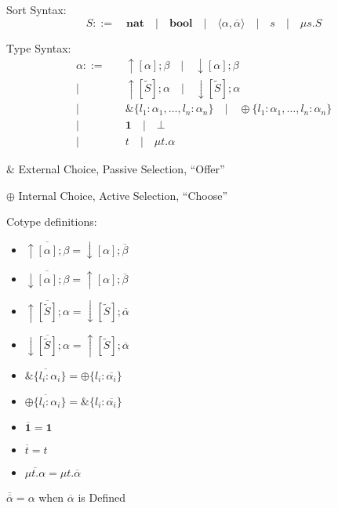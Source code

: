 Sort Syntax:
\cite{honda-vasconcelos-kubo98}
\[
  S ::= \quad \mathbf{nat} \quad
      | \quad \mathbf{bool} \quad
      | \quad \langle \alpha, \overline{\alpha} \rangle \quad
      | \quad s \quad
      | \quad \mu s.S
\]

Type Syntax:
\cite{honda-vasconcelos-kubo98}
\[
\begin{split}
  \alpha  ::=&\quad \uparrow[\alpha]; \beta \quad
            | \quad \downarrow[\alpha]; \beta \\
            |&\quad \uparrow[\tilde{S}]; \alpha \quad
            | \quad \downarrow[\tilde{S}]; \alpha \\
            |&\quad \& \{ l_1 : \alpha_1, \ldots, l_n : \alpha_n \} \quad
            | \quad \oplus \{ l_1 : \alpha_1, \ldots, l_n : \alpha_n \} \\
            |&\quad \mathbf{1} \quad
            | \quad \bot \quad \\
            |&\quad t \quad
            | \quad \mu t.\alpha
\end{split}
\]

$\&$ External Choice, Passive Selection, ``Offer''

$\oplus$ Internal Choice, Active Selection, ``Choose''


Cotype definitions:
\cite{honda-vasconcelos-kubo98}
\begin{itemize}
  \item $\overline{\uparrow[\alpha]; \beta}
    = \downarrow[\alpha]; \overline{\beta}$
  \item $\overline{\downarrow[\alpha]; \beta}
    = \uparrow[\alpha]; \overline{\beta}$
  \item $\overline{\uparrow[\tilde{S}]; \alpha}
    = \downarrow[\tilde{S}]; \overline{\alpha}$
  \item $\overline{\downarrow[\tilde{S}]; \alpha}
    = \uparrow[\tilde{S}]; \overline{\alpha}$
  \item $\overline{\& \{ l_i : \alpha_i \}}
    = \oplus \{ l_i : \overline{\alpha_i} \}$
  \item $\overline{\oplus \{ l_i : \alpha_i \}}
    = \& \{ l_i : \overline{\alpha_i} \}$
  \item $\overline{\mathbf{1}} = \mathbf{1}$
  \item $\overline{t} = t$
  \item $\overline{\mu t.\alpha} = \mu t.\overline{\alpha}$
\end{itemize}

$\overline{\overline{\alpha}} = \alpha$ when $\overline{\alpha}$ is
  Defined

